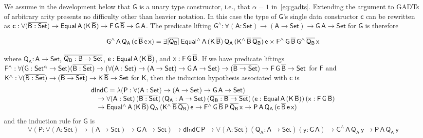 \documentclass[9pt]{entcs}
\begin{document}
We assume in the development below that $\mathsf{G}$ is a unary type
constructor, i.e., that $\alpha = 1$ in~\eqref{eq:gadts}. Extending
the argument to GADTs of arbitrary arity presents no difficulty other
than heavier notation. In this case the type of $\mathsf{G}$'s single
data constructor $\mathsf{c}$ can be rewritten as $\mathsf{c : \forall
  (\overline{B : Set}) \to Equal\,A\,(K\,\overline{B}) \to F\,G\,\overline{B} \to
  G\,A}$. The predicate lifting $\mathsf{G^{\wedge} : \forall (A :
  Set) \to (A \to Set) \to G\,A \to Set}$ for $\mathsf{G}$ is
therefore

\vspace*{-0.05in}

\[\mathsf{G^{\wedge}\,A\,Q_A\,(c\,\overline{B}\,e\,x)
= \exists [\overline{Q_B}]\,
Equal^{\wedge}\,A\,(K\,\overline{B})\,Q_A\,(K^{\wedge}\,\overline{B}\,\overline{Q_B})\,e
\times F^{\wedge}\,G\,\overline{B}\,G^{\wedge}\,{\overline{Q_B}}\,x}\]

\noindent
where $\mathsf{Q_A : A \to Set}$, $\overline{\mathsf{Q_B : B \to Set}}$,
$\mathsf{e : Equal\,A\,(K\,\overline{B})}$, and $\mathsf{x : F\,G\,\overline{B}}$.
If we have predicate liftings $\mathsf{F^{\wedge}} : \mathsf{\forall
  (G : Set^{\alpha} \to Set) (\overline{B : Set}) \to (\forall (A : Set) \to
  (A \to Set) \to G\,A \to Set) \to (\overline{B \to Set}) \to F\,G\,\overline{B}
  \to Set}$ for $\mathsf{F}$ and $\mathsf{K^{\wedge}} :
\mathsf{\forall (\overline{B : Set}) \to (\overline{B \to Set}) \to K\,\overline{B} \to
  Set}$
for $\mathsf{K}$, then the induction hypothesis associated with
$\mathsf{c}$ is
\[\begin{array}{l}
\mathsf{dIndC = \lambda (P : \forall (A : Set) \to (A \to Set) \to
  G\,A \to Set)}\\
\quad \mathsf{\to \forall (A : Set)\, (\overline{B : Set})\, (Q_A : A \to Set)\,
  (\overline{Q_B : B \to Set})\, (e : Equal\,A\,(K\,\overline{B}))\, (x :
  F\,G\,\overline{B})} \\ 
\quad \mathsf{\to
  Equal^{\wedge}\,A\,(K\,\overline{B})\,Q_A\,(K^{\wedge}\,\overline{B}\,\overline{Q_B})\,e
  \to F^{\wedge}\,G\,\overline{B}\,P\,\overline{Q_B}\,x \to
  P\,A\,Q_A\,(c\,\overline{B}\,e\,x)} 
\end{array}\]
and the induction rule for $\mathsf{G}$ is
\[
\mathsf{\forall (P : \forall (A : Set) \to (A \to Set) \to G\,A \to
  Set) \to dIndC\,P \to \forall (A : Set)(Q_A : A \to Set)(y : G\,A)
\to G^{\wedge}\,A\,Q_A\,y \to P\,A\,Q_A\,y} \]
\end{document}
